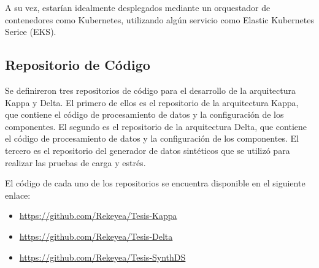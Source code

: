 A su vez, estarían idealmente desplegados mediante un orquestador de contenedores como Kubernetes, utilizando algún servicio como Elastic Kubernetes Serice (EKS).


\subsection{Repositorio de Código}

Se definireron tres repositorios de código para el desarrollo de la arquitectura Kappa y Delta.
El primero de ellos es el repositorio de la arquitectura Kappa, que contiene el código de procesamiento de datos y la configuración de los componentes.
El segundo es el repositorio de la arquitectura Delta, que contiene el código de procesamiento de datos y la configuración de los componentes.
El tercero es el repositorio del generador de datos sintéticos que se utilizó para realizar las pruebas de carga y estrés.

El código de cada uno de los repositorios se encuentra disponible en el siguiente enlace:

\begin{itemize}
    \item \url{https://github.com/Rekeyea/Tesis-Kappa}\\
    \item \url{https://github.com/Rekeyea/Tesis-Delta}\\
    \item \url{https://github.com/Rekeyea/Tesis-SynthDS}\\
\end{itemize}